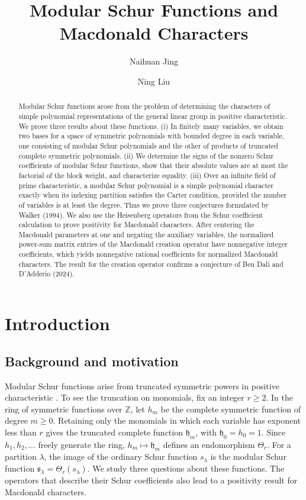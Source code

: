 \documentclass[12pt,reqno,a4paper]{amsart}
\title[Modular Schur Functions and Macdonald Characters]
{Modular Schur Functions and Macdonald Characters}
\author{Naihuan Jing}
\author{Ning Liu}
\numberwithin{equation}{section}
\numberwithin{figure}{section}
\theoremstyle{plain}
\theoremstyle{definition}
\begin{document}
\begin{abstract}
Modular Schur functions arose from the problem of determining the
characters of simple polynomial representations of the general linear
group in positive characteristic.  We prove three results about these
functions.  (i) In finitely many variables, we obtain two bases for a
space of symmetric polynomials with bounded degree in each variable,
one consisting of modular Schur polynomials and the other of products
of truncated complete symmetric polynomials.
(ii) We determine the signs of the nonzero Schur coefficients of modular
Schur functions, show that their absolute values are at most the factorial
of the block weight, and characterize equality.
(iii) Over an infinite field of prime characteristic, a modular Schur
polynomial is a simple polynomial character exactly
when its indexing partition satisfies the Carter condition, provided
the number of variables is at least the degree. Thus we prove three conjectures formulated by Walker (1994).
We also use the Heisenberg operators from the Schur coefficient
calculation to prove positivity for Macdonald characters.
After centering the Macdonald parameters at one and negating the
auxiliary variables, the normalized power-sum matrix entries of the
Macdonald creation operator have nonnegative integer coefficients,
which yields nonnegative rational coefficients for normalized
Macdonald characters.  The result for the creation operator confirms
a conjecture of Ben Dali and D'Adderio (2024).
\end{abstract}

\maketitle

\setcounter{tocdepth}{1}
\tableofcontents

\section{Introduction}
\label{sec:introduction}

\subsection{Background and motivation}

Modular Schur functions arise from truncated symmetric powers in
positive characteristic \cite{DotyWalker,Walker}.  To see the
truncation on monomials, fix an integer $r\geq2$.  In the ring of
symmetric functions over $\mathbb Z$, let $h_m$ be the complete
symmetric function of degree $m\geq0$.  Retaining only the monomials
in which each variable has exponent less than $r$ gives the truncated
complete function $\mathfrak h_m$, with $\mathfrak h_0=h_0=1$.
Since $h_1,h_2,\ldots$ freely generate the ring, $h_m\mapsto\mathfrak h_m$
defines an endomorphism $\Theta_r$.  For a partition $\lambda$, the
image of the ordinary Schur function $s_\lambda$ is the modular Schur
function $\mathfrak s_\lambda=\Theta_r(s_\lambda)$.  We study three
questions about these functions.  The operators that describe their
Schur coefficients also lead to a positivity result for Macdonald
characters.
\end{document}
